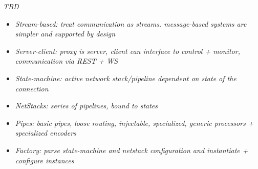 \emph{TBD} %
\begin{itemize}
    \item \emph{Stream-based: treat communication as streams. message-based systems are simpler and supported by design}
    \item \emph{Server-client: proxy is server, client can interface to control + monitor, communication via REST + WS}
    \item \emph{State-machine: active network stack/pipeline dependent on state of the connection}
    \item \emph{NetStacks: series of pipelines, bound to states}
    \item \emph{Pipes: basic pipes, loose routing, injectable, specialized, generic processors + specialized encoders}
    \item \emph{Factory: parse state-machine and netstack configuration and instantiate + configure instances}
\end{itemize}